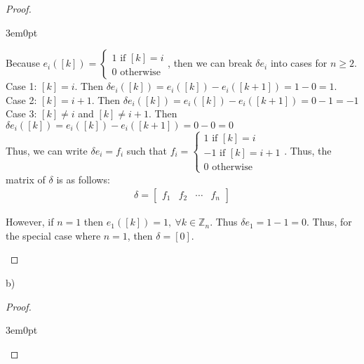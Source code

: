 \documentclass[11pt]{article}
\newcommand{\Z}{\mathbb{Z}}
\newenvironment{myproof}
{\begin{proof} \begin{adjustwidth}{3em}{0pt}$ $\par\nobreak\ignorespaces}
{\end{adjustwidth} \end{proof}}
\begin{document}
\begin{flushleft}
\begin{myproof}
Because $e_i([k]) = \begin{cases} 1 \text{ if } [k] = i \\ 0 \text{ otherwise} \end{cases}$, then we can break $\delta e_i$ into cases for $n \geq 2$. \\
\bigskip
Case 1: $[k] = i$. Then $\delta e_i([k]) = e_i([k]) - e_i([k+1]) = 1 - 0 = 1$. \\
Case 2: $[k] = i + 1$. Then $\delta e_i([k]) = e_i([k]) - e_i([k+1]) = 0 - 1 = -1$ \\
Case 3: $[k] \neq i$ and $[k] \neq i + 1$. Then $\delta e_i([k]) = e_i([k]) - e_i([k+1]) = 0 - 0 = 0$ \\
\bigskip
Thus, we can write $\delta e_i = f_i$ such that $f_i = \begin{cases} 1 \text{ if } [k] = i \\ -1 \text{ if } [k] = i+1 \\ 0 \text{ otherwise} \end{cases}$. Thus, the matrix of $\delta$ is as follows:
\begin{align*}
\delta = 
\begin{bmatrix}
f_1 & f_2 & \cdots & f_n
\end{bmatrix}
\end{align*}

However, if $n = 1$ then $e_1([k]) = 1, \ \forall k \in \Z_n$. Thus $\delta e_1 = 1 - 1 = 0$. Thus, for the special case where $n = 1$, then $\delta = [0]$.

\end{myproof}

b)

\begin{myproof}


\end{myproof}
\end{flushleft}
\end{document}
